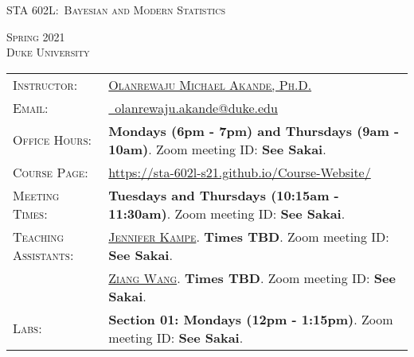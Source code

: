 \documentclass[11pt, a4paper]{article}
\begin{document}
\renewcommand{\arraystretch}{1.5}	


\begin{center}
{\Large \textsc{STA 602L:\ Bayesian and Modern Statistics}}
\end{center}


\begin{center}
	\textsc{Spring 2021} \\
	\textsc{Duke University} \\
\end{center}



\begin{center}
	\begin{minipage}[t]{.95\textwidth}
		\begin{tabular}{@{}L{3cm}L{12.5cm}}
			\toprule[0.065cm]
			\textsc{Instructor:} & \href{https://akandelanre.github.io.}{\textsc{Olanrewaju Michael Akande, Ph.D.}} \\
			\textsc{Email:} &\href{mailto:olanrewaju.akande@duke.edu}{\Envelope ~olanrewaju.akande@duke.edu} \\
			\textsc{Office Hours:} & \textbf{Mondays (6pm - 7pm) and Thursdays (9am - 10am)}. \newline Zoom meeting ID: \textbf{See Sakai}. \\
			\textsc{Course Page:} & \href{https://sta-602l-s21.github.io/Course-Website/}{https://sta-602l-s21.github.io/Course-Website/} \\
			\textsc{Meeting Times:}  & \textbf{Tuesdays and Thursdays (10:15am - 11:30am)}. \newline Zoom meeting ID: \textbf{See Sakai}. \\
			\textsc{Teaching Assistants:} & \href{https://scholars.duke.edu/person/jennifer.kampe}{\textsc{Jennifer Kampe}}. 
			\newline \textbf{Times TBD}. \newline Zoom meeting ID: \textbf{See Sakai}.  \\
			&\href{https://scholars.duke.edu/person/ziang.wang}{\textsc{Ziang Wang}}. 
			\newline \textbf{Times TBD}. \newline Zoom meeting ID: \textbf{See Sakai}. \\
			\textsc{Labs:} & \textbf{Section 01: Mondays (12pm - 1:15pm)}. 
			\newline Zoom meeting ID: \textbf{See Sakai}.  \\

\end{tabular}
\end{minipage}
\end{center}
\end{document}

